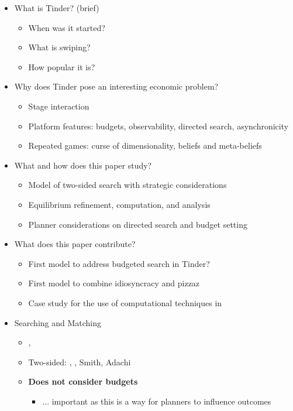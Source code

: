 \begin{itemize}
    \item What is Tinder? (brief)
    \begin{itemize}
        \item When was it started?
        \item What is swiping?
        \item How popular it is?
    \end{itemize}
    \item Why does Tinder pose an interesting economic problem?
    \begin{itemize}
        \item Stage interaction
        \item Platform features: budgets, observability, directed search, asynchronicity
        \item Repeated games: curse of dimensionality, beliefs and meta-beliefs
    \end{itemize}
    \item What and how does this paper study?
    \begin{itemize}
        \item Model of two-sided search with strategic considerations
        \item Equilibrium refinement, computation, and analysis
        \item Planner considerations on directed search and budget setting
    \end{itemize}
    \item What does this paper contribute?
    \begin{itemize}
        \item First model to address budgeted search in Tinder?
        \item First model to combine idiosyncracy and pizzaz
        \item Case study for the use of computational techniques in 
    \end{itemize} 
    \item Searching and Matching
    \begin{itemize}
        \item \cite{gale_shapley_1962}, \cite{roth_sotomayor_1992}
        \item Two-sided: \cite{burdett1998two}, \cite{chade2006matching}, Smith, Adachi
        \item \textbf{Does not consider budgets}
        \begin{itemize}
            \item ... important as this is a way for planners to influence outcomes

\end{itemize}
\end{itemize}
\end{itemize}
